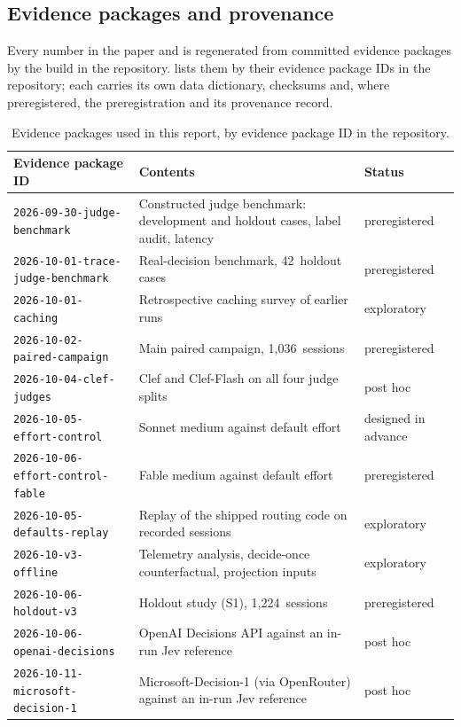 \documentclass[11pt,letterpaper]{article}
\newcommand{\NSessions}{1{,}036}
\newcommand{\SOneSessions}{1{,}224}
\newcommand{\TrN}{42}
\begin{document}
\subsection{Evidence packages and provenance}\label{sec:evidence}

Every number in the paper and \thissupp{} is regenerated from committed evidence packages by the build in the
repository.  lists them by their evidence package IDs in the repository; each carries its own data dictionary, checksums and,
where preregistered, the preregistration and its provenance record.

\begin{table}[tbp]
\centering\small
\caption{Evidence packages used in this report, by evidence package ID in the repository.}
\label{tab:evidence}
\begin{tabularx}{\textwidth}{@{}l >{\raggedright\arraybackslash}X l@{}}
\toprule
Evidence package ID & Contents & Status \\
\midrule
\texttt{2026-09-30-judge-benchmark} & Constructed judge benchmark: development and holdout cases, label audit, latency
  & preregistered \\
\texttt{2026-10-01-trace-judge-benchmark} & Real-decision benchmark, \TrN\ holdout cases & preregistered \\
\texttt{2026-10-01-caching} & Retrospective caching survey of earlier runs & exploratory \\
\texttt{2026-10-02-paired-campaign} & Main paired campaign, \NSessions\ sessions & preregistered \\
\texttt{2026-10-04-clef-judges} & Clef and Clef-Flash on all four judge splits & post hoc \\
\texttt{2026-10-05-effort-control} & Sonnet medium against default effort & designed in advance \\
\texttt{2026-10-06-effort-control-fable} & Fable medium against default effort & preregistered \\
\texttt{2026-10-05-defaults-replay} & Replay of the shipped routing code on recorded sessions & exploratory \\
\texttt{2026-10-v3-offline} & Telemetry analysis, decide-once counterfactual, projection inputs & exploratory \\
\texttt{2026-10-06-holdout-v3} & Holdout study (S1), \SOneSessions\ sessions & preregistered \\
\texttt{2026-10-06-openai-decisions} & OpenAI Decisions API against an in-run Jev reference & post hoc \\
\texttt{2026-10-11-microsoft-decision-1} & Microsoft-Decision-1 (via OpenRouter) against an in-run Jev reference & post hoc \\
\bottomrule
\end{tabularx}
\end{table}
\end{document}
